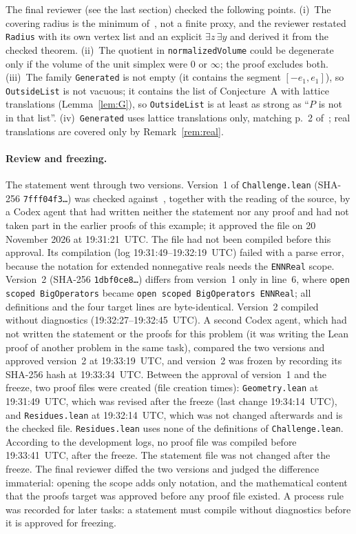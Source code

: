 \documentclass[11pt]{article}
\theoremstyle{definition}
\theoremstyle{remark}
\begin{document}
{The final reviewer (see the last section) checked the following points. (i)~The
covering radius is the minimum of~\cite{css}, not a finite proxy, and the
reviewer restated \texttt{Radius} with its own vertex list and an explicit
$\exists z\,\exists y$ and derived it from the checked theorem. (ii)~The
quotient in \texttt{normalizedVolume} could be degenerate only if the volume of
the unit simplex were $0$ or $\infty$; the proof excludes both. (iii)~The
family \texttt{Generated} is not empty (it contains the segment
$[-e_1,e_1]$), so \texttt{OutsideList} is not vacuous; it contains the list
of Conjecture~A with lattice translations (Lemma~\ref{lem:G}), so
\texttt{OutsideList} is at least as strong as ``$P$ is not in that list''.
(iv)~\texttt{Generated} uses lattice translations only, matching p.~2
of~\cite{css}; real translations are covered only by
Remark~\ref{rem:real}.

\paragraph{Review and freezing.}
The statement went through two versions. Version~1 of \texttt{Challenge.lean}
(SHA-256 \texttt{7fff04f3\ldots}) was checked against~\cite{css}, together
with the reading of the source, by a Codex agent that had written neither the
statement nor any proof and had not taken part in the earlier proofs of this
example; it approved the file on 20 November 2026 at 19:31:21~UTC. The file
had not been compiled before this approval. Its compilation (log
19:31:49--19:32:19~UTC) failed with a parse error, because the notation for
extended nonnegative reals needs the \texttt{ENNReal} scope. Version~2
(SHA-256 \texttt{1dbf0ce8\ldots}) differs from version~1 only in line~6,
where \texttt{open scoped BigOperators} became \texttt{open scoped
BigOperators ENNReal}; all definitions and the four target lines are
byte-identical. Version~2 compiled without diagnostics (19:32:27--19:32:45~UTC).
A second Codex agent, which had not written the statement or the proofs for
this problem (it was writing the Lean proof of another problem in the same
task), compared the two versions and approved version~2 at 19:33:19~UTC, and
version~2 was frozen by recording its SHA-256 hash at 19:33:34~UTC. Between the
approval of version~1 and the freeze, two proof files were created (file
creation times): \texttt{Geometry.lean} at 19:31:49~UTC, which was revised
after the freeze (last change 19:34:14~UTC), and \texttt{Residues.lean} at
19:32:14~UTC, which was not changed afterwards and is the checked file.
\texttt{Residues.lean} uses none of the definitions of \texttt{Challenge.lean}. According to the development logs, no
proof file was compiled before 19:33:41~UTC, after the freeze. The statement file was not changed after
the freeze. The final reviewer diffed the two versions and judged the
difference immaterial: opening the scope adds only notation, and the
mathematical content that the proofs target was approved before any proof
file existed. A process rule was recorded for later tasks: a statement must
compile without diagnostics before it is approved for freezing.

}
\end{document}
